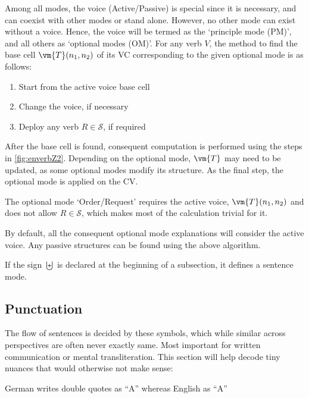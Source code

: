 Among all modes, the voice (Active/Passive) is special since it is necessary, and can coexist with other modes or stand alone. However, no other mode can exist without a voice. Hence, the voice will be termed as the `principle mode (PM)', and all others as `optional modes (OM)'. For any verb $V$, the method to find the base cell $\vm{T}(n_1,n_2)$ of its VC corresponding to the given optional mode is as follows:
\begin{enumerate}
    \item Start from the active voice base cell
    \item Change the voice, if necessary
    \item Deploy any verb $R\in\mathcal{S}$, if required
\end{enumerate}
After the base cell is found,  consequent computation is performed using the steps in \autoref{fig:enverbZ2}. Depending on the optional mode, $\vm{T}$ may need to be updated, as some optional modes  modify its structure. As the final step, the optional mode is applied on the CV. 
\begin{example}
The optional mode `Order/Request' requires the active voice, $\vm{T}(n_1,n_2)$ and does not allow $R\in\mathcal{S}$, which makes most of the calculation trivial for it. 
\end{example}
By default, all the consequent optional mode explanations will  consider the active voice. Any passive structures can be found using the above algorithm.

If the sign $\biguplus $ is declared at the beginning of a subsection, it defines a sentence mode.
\subsection{Punctuation}
The flow of sentences is  decided by these symbols, which while similar across perspectives are often never exactly  same. Most important for written communication or mental transliteration. This section will help decode tiny nuances that would otherwise not make sense: 
\begin{example}
German writes double quotes as \textgerman{\enquote{A}} whereas English as \enquote{A}
\end{example}


